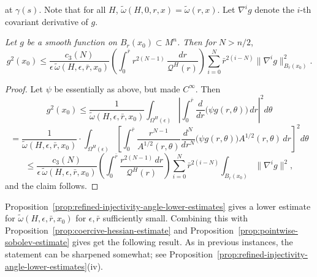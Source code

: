 at $\gamma(s)$. Note that for all $H$, $\widetilde{\omega}(H,0,r,x)=\widetilde{\omega}(r,x)$. Let $\nabla^i g$ denote the $i$-th
covariant derivative of $g$.

\begin{proposition}
\label{prop:pointwise-sobolev-estimate}

\textit{Let $g$ be a smooth function on $B_r(x_0)\subset M^n$. Then for}
$N>n/2$,
\begin{equation}\tag{2.45}
g^2(x_0)\le \frac{c_3(N)}{\epsilon\,\widetilde{\omega}(H,\epsilon,\bar r,x_0)}
\left(\int_0^{\bar r} r^{2(N-1)}\,\frac{dr}{\mathcal{Q}^H(r)}\right)
\sum_{i=0}^N \bar r^{2(i-N)}\|\nabla^i g\|^2_{B_{\bar r}(x_0)}.
\end{equation}
\end{proposition}

\begin{proof}
\sketch
Let $\psi$ be essentially as above, but made $C^\infty$. Then
\begin{equation}
g^2(x_0)\le \frac{1}{\widetilde{\omega}(H,\epsilon,\bar r,x_0)}
\int_{\Omega^H(\epsilon)}\left|\int_0^{\bar r}\frac{d}{dr}\bigl(\psi g(r,\theta)\bigr)\,dr\right|^2 d\theta
\end{equation}
\begin{equation}\tag{2.46}
= \frac{1}{\widetilde{\omega}(H,\epsilon,\bar r,x_0)}
\cdot \int_{\Omega^H(\epsilon)}\left[\int_0^{\bar r}\frac{r^{N-1}}{A^{1/2}(r,\theta)}\frac{d^N}{dr^N}\bigl(\psi g(r,\theta)\bigr)A^{1/2}(r,\theta)\,dr\right]^2 d\theta
\end{equation}
\[
\le \frac{c_3(N)}{\epsilon\,\widetilde{\omega}(H,\epsilon,\bar r,x_0)}
\left(\int_0^{\bar r}\frac{r^{2(N-1)}\,dr}{\mathcal{Q}^H(r)}\right)
\sum_{i=0}^N \bar r^{2(i-N)}\int_{B_{\bar r}(x_0)}\|\nabla^i g\|^2,
\]
and the claim follows.
\end{proof}

Proposition~\ref{prop:refined-injectivity-angle-lower-estimates} gives a lower estimate for $\widetilde{\omega}(H,\epsilon,\bar r,x_0)$ for $\epsilon,\bar r$
sufficiently small. Combining this with Proposition~\ref{prop:coercive-hessian-estimate} and
Proposition~\ref{prop:pointwise-sobolev-estimate} gives
get the following result. As in previous instances, the statement can be
sharpened somewhat; see Proposition~\ref{prop:refined-injectivity-angle-lower-estimates}(iv).

